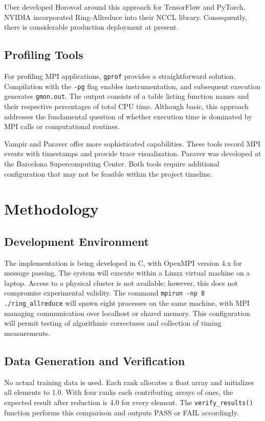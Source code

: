 \documentclass[12pt,a4paper]{article}
\begin{document}
Uber developed Horovod around this approach for TensorFlow and PyTorch. NVIDIA incorporated Ring-Allreduce into their NCCL library. Consequently, there is considerable production deployment at present.

\subsection{Profiling Tools}

For profiling MPI applications, \texttt{gprof} provides a straightforward solution. Compilation with the \texttt{-pg} flag enables instrumentation, and subsequent execution generates \texttt{gmon.out}. The output consists of a table listing function names and their respective percentages of total CPU time. Although basic, this approach addresses the fundamental question of whether execution time is dominated by MPI calls or computational routines.

Vampir and Paraver offer more sophisticated capabilities. These tools record MPI events with timestamps and provide trace visualization. Paraver was developed at the Barcelona Supercomputing Center. Both tools require additional configuration that may not be feasible within the project timeline.

\section{Methodology}

\subsection{Development Environment}

The implementation is being developed in C, with OpenMPI version 4.x for message passing. The system will execute within a Linux virtual machine on a laptop. Access to a physical cluster is not available; however, this does not compromise experimental validity. The command \texttt{mpirun -np 8 ./ring\_allreduce} will spawn eight processes on the same machine, with MPI managing communication over localhost or shared memory. This configuration will permit testing of algorithmic correctness and collection of timing measurements.

\subsection{Data Generation and Verification}

No actual training data is used. Each rank allocates a float array and initializes all elements to 1.0. With four ranks each contributing arrays of ones, the expected result after reduction is 4.0 for every element. The \texttt{verify\_results()} function performs this comparison and outputs PASS or FAIL accordingly.
\end{document}
